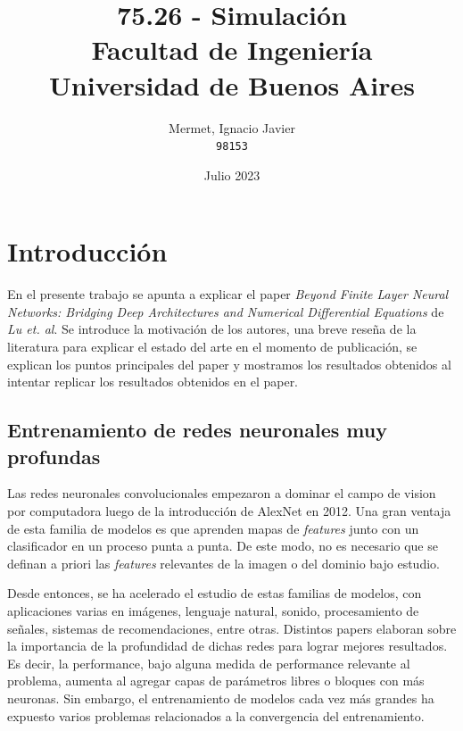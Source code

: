\documentclass[titlepage,a4paper,oneside]{article}
\begin{document}
\begin{titlepage}
\title{
	75.26 \-- Simulación \\
    \large Facultad de Ingeniería\\
	Universidad de Buenos Aires
}
\author{
	Mermet, Ignacio Javier\\
	\texttt{98153}
}
\date{Julio 2023}

\maketitle

\end{titlepage}

\tableofcontents

\newpage

\section{Introducción}
En el presente trabajo se apunta a explicar el paper \textit{Beyond Finite Layer Neural Networks: Bridging Deep Architectures and Numerical Differential Equations}\cite{lu18d} de \textit{Lu et. al}.  Se introduce la motivación de los autores, una breve reseña de la literatura para explicar el estado del arte en el momento de publicación, se explican los puntos principales del paper y mostramos los resultados obtenidos al intentar replicar los resultados obtenidos en el paper.

\subsection{Entrenamiento de redes neuronales muy profundas}
Las redes neuronales convolucionales empezaron a dominar el campo de vision por computadora luego de la introducción de AlexNet \cite{DBLP:journals/corr/Krizhevsky14} en 2012. Una gran ventaja de esta familia de modelos es que aprenden mapas de \textit{features} junto con un clasificador en un proceso punta a punta. De este modo, no es necesario que se definan a priori las \textit{features} relevantes de la imagen o del dominio bajo estudio.

Desde entonces, se ha acelerado el estudio de estas familias de modelos, con aplicaciones varias en imágenes, lenguaje natural, sonido, procesamiento de señales, sistemas de recomendaciones, entre otras. Distintos papers elaboran sobre la importancia de la profundidad de dichas redes para lograr mejores resultados. Es decir, la performance, bajo alguna medida de performance relevante al problema, aumenta al agregar capas de parámetros libres o bloques con más neuronas. Sin embargo, el entrenamiento de modelos cada vez más grandes ha expuesto varios problemas relacionados a la convergencia del entrenamiento.
\end{document}
